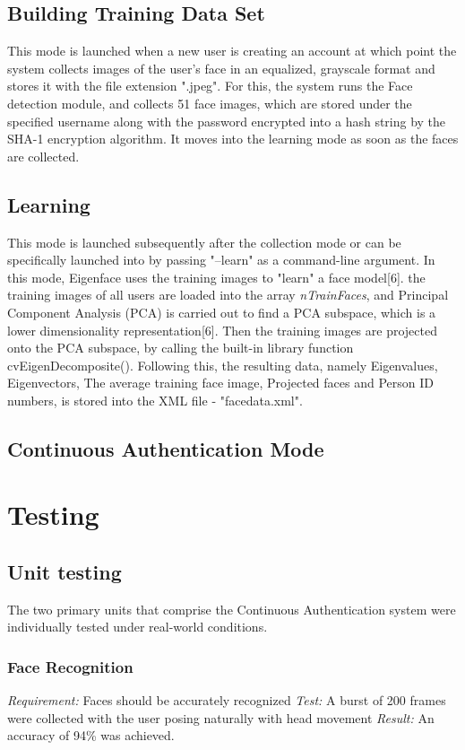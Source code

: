 \documentclass[12pt]{article}			%
\begin{document}
\subsection { Building Training Data Set }
This mode is launched when a new user is creating an account at which point the system collects images of the user's face in an equalized, grayscale format and stores it with the file extension ".jpeg". For this, the system runs the Face detection module, and collects 51 face images, which are stored under the specified username along with the password encrypted into a hash string by the SHA-1 encryption algorithm. It moves into the learning mode as soon as the faces are collected. 
\subsection { Learning }
This mode is launched subsequently after the collection mode or can be specifically launched into by passing "--learn" as a command-line argument. In this mode, Eigenface uses the training images to "learn" a face model[6]. the training images of all users are loaded into the array \emph {nTrainFaces}, and Principal Component Analysis (PCA) is carried out to find a PCA subspace, which is a lower dimensionality representation[6]. Then the training images are projected onto the PCA subspace, by calling the built-in library function cvEigenDecomposite(). Following this, the resulting data, namely Eigenvalues, Eigenvectors, The average training face image, Projected faces and Person ID numbers, is stored into the XML file - "facedata.xml".    
\subsection { Continuous Authentication Mode }

\section{ Testing }

\subsection{ Unit testing }
The two primary units that comprise the Continuous Authentication system were individually tested under real-world conditions.

\subsubsection{ Face Recognition }
\emph{ Requirement: } Faces should be accurately recognized
\emph{ Test: } A burst of 200 frames were collected with the user posing naturally with head movement
\emph{ Result: } An accuracy of 94\% was achieved.
\end{document}
